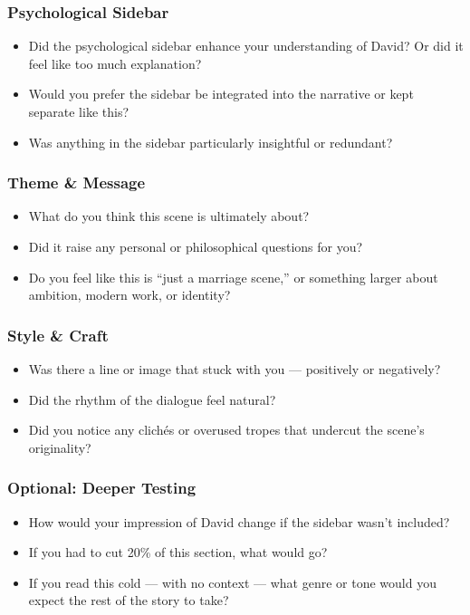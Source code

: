 \subsubsection{Psychological Sidebar}

\begin{itemize}
  \item Did the psychological sidebar enhance your understanding of David? Or did it feel like too much explanation?
  \item Would you prefer the sidebar be integrated into the narrative or kept separate like this?
  \item Was anything in the sidebar particularly insightful or redundant?
\end{itemize}

\subsubsection{Theme \& Message}

\begin{itemize}
  \item What do you think this scene is ultimately about?
  \item Did it raise any personal or philosophical questions for you?
  \item Do you feel like this is “just a marriage scene,” or something larger about ambition, modern work, or identity?
\end{itemize}

\subsubsection{Style \& Craft}

\begin{itemize}
  \item Was there a line or image that stuck with you — positively or negatively?
  \item Did the rhythm of the dialogue feel natural?
  \item Did you notice any clichés or overused tropes that undercut the scene’s originality?
\end{itemize}

\subsubsection{Optional: Deeper Testing}

\begin{itemize}
  \item How would your impression of David change if the sidebar wasn’t included?
  \item If you had to cut 20\% of this section, what would go?
  \item If you read this cold — with no context — what genre or tone would you expect the rest of the story to take?
\end{itemize}

